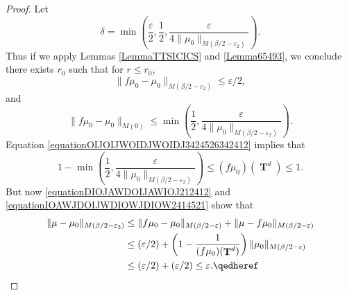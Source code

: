 \documentclass[12pt,reqno]{article}
\numberwithin{equation}{section}
\DeclareMathOperator{\TT}{\mathbf{T}}
\numberwithin{theorem}{section}
\begin{document}
\begin{proof}
    Let
    \[ \delta = \min \left( \frac{\varepsilon}{2}, \frac{1}{2}, \frac{\varepsilon}{4 \| \mu_0 \|_{M(\beta/2-\varepsilon_2)}} \right). \]
    Thus if we apply Lemmas \ref{LemmaTTSICICS} and \ref{Lemma65493}, we conclude there exists $r_0$ such that for $r \leq r_0$,
    \begin{equation} \label{equationDIOJAWDOIJAWIOJ212412}
        \| f \mu_0 - \mu_0 \|_{M(\beta/2 - \varepsilon_2)} \leq \varepsilon/2,
    \end{equation}
    and
    \begin{equation} \label{equationOIJOIJWOIDJWOIDJ3424526342412}
        \| f \mu_0 - \mu_0 \|_{M(0)} \leq \min \left( \frac{1}{2}, \frac{\varepsilon}{4 \| \mu_0 \|_{M(\beta/2 - \varepsilon_2)}} \right).
    \end{equation}
    Equation \eqref{equationOIJOIJWOIDJWOIDJ3424526342412} implies that
    \begin{equation} \label{equationIOAWJDOIJWDIOWJDIOW2414521}
        1 - \min \left( \frac{1}{2}, \frac{\varepsilon}{4 \| \mu_0 \|_{M(\beta/2 - \varepsilon_2)}} \right) \leq (f\mu_0)(\TT^d) \leq 1.
    \end{equation}
    But now \eqref{equationDIOJAWDOIJAWIOJ212412} and \eqref{equationIOAWJDOIJWDIOWJDIOW2414521} show that
    \begin{equation}
    \begin{split}
        \| \mu - \mu_0 \|_{M(\beta/2 - \varepsilon_2)} &\leq \| f \mu_0 - \mu_0 \|_{M(\beta/2 - \varepsilon)} + \| \mu - f \mu_0 \|_{M(\beta/2 - \varepsilon)}\\
        &\leq (\varepsilon/2) + \left( 1 - \frac{1}{(f \mu_0)(\TT^d)} \right) \| \mu_0 \|_{M(\beta/2 - \varepsilon)}\\
        &\leq (\varepsilon/2) + (\varepsilon/2) \leq \varepsilon. \qedheref
    \end{split}
    \end{equation}
\end{proof}
\end{document}
